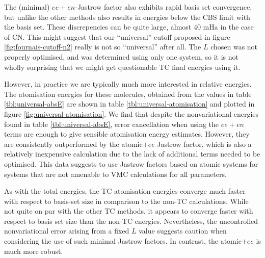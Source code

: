 The (minimal) $ee+en$-Jastrow factor also exhibits rapid basis set convergence, but unlike the other methods also results in energies below the CBS limit with the \vqz basis set. These discrepencies can be quite large, almost 40 mHa in the case of CN. This might suggest that our ``universal'' cutoff proposed in figure \ref{fig:fournais-cutoff-n2} really is not so ``universal'' after all. The $L$ chosen was not properly optimised, and was determined using only one system, so it is not wholly surprising that we might get questionable TC final energies using it.

However, in practice we are typically much more interested in relative energies. The atomisation energies for these molecules, obtained from the values in table \ref{tbl:universal-absE} are shown in table \ref{tbl:universal-atomisation} and plotted in figure \ref{fig:universal-atomisation}.
We find that despite the nonvariational energies found in table \ref{tbl:universal-absE}, error cancellation when using the $ee+en$ terms are enough to give sensible atomisation energy estimates. However, they are consistently outperformed by the atomic$+ee$ Jastrow factor, which is also a relatively inexpensive calculation due to the lack of additional terms needed to be optimised. This data suggests to use Jastrow factors based on atomic systems for systems that are not amenable to VMC calculations for all parameters.

As with the total energies, the TC atomisation energies converge much faster with respect to basis-set size in comparison to the non-TC calculations. While not quite on par with the other TC methods, it appears to converge faster with respect to basis set size than the non-TC energies. Nevertheless, the uncontrolled nonvariational error arising from a fixed $L$ value suggests caution when considering the use of such minimal Jastrow factors. In contrast, the atomic$+ee$ is much more robust.


